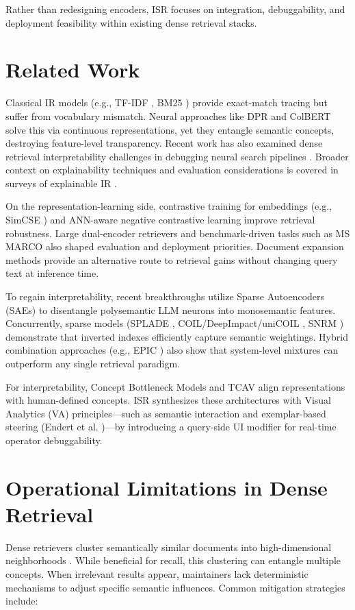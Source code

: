 \documentclass[sigconf,authordraft]{acmart}
\begin{document}
Rather than redesigning encoders, ISR focuses on integration, debuggability, and deployment feasibility within existing dense retrieval stacks.

\section{Related Work}
Classical IR models (e.g., TF-IDF \cite{croft2010}, BM25 \cite{robertson2009}) provide exact-match tracing but suffer from vocabulary mismatch. Neural approaches like DPR \cite{karpukhin2020} and ColBERT \cite{khattab2020} solve this via continuous representations, yet they entangle semantic concepts, destroying feature-level transparency. Recent work has also examined dense retrieval interpretability challenges in debugging neural search pipelines \cite{zhao2023}. Broader context on explainability techniques and evaluation considerations is covered in surveys of explainable IR \cite{anand2022}.

On the representation-learning side, contrastive training for embeddings (e.g., SimCSE \cite{gao2021}) and ANN-aware negative contrastive learning \cite{xiong2021} improve retrieval robustness. Large dual-encoder retrievers \cite{ni2022} and benchmark-driven tasks such as MS MARCO \cite{craswell2020} also shaped evaluation and deployment priorities. Document expansion methods \cite{nogueira2019} provide an alternative route to retrieval gains without changing query text at inference time.

To regain interpretability, recent breakthroughs utilize Sparse Autoencoders (SAEs) \cite{bricken2023, cunningham2024} to disentangle polysemantic LLM neurons into monosemantic features.
Concurrently, sparse models (SPLADE \cite{formal2021}, COIL/DeepImpact/uniCOIL \cite{lin2021_notes}, SNRM \cite{zamani2017}) demonstrate that inverted indexes efficiently capture semantic weightings. Hybrid combination approaches (e.g., EPIC \cite{macavaney2020}) also show that system-level mixtures can outperform any single retrieval paradigm.

For interpretability, Concept Bottleneck Models and TCAV \cite{kim2018} align representations with human-defined concepts. ISR synthesizes these architectures with Visual Analytics (VA) principles—such as semantic interaction and exemplar-based steering (Endert et al. \cite{endert2018})—by introducing a query-side UI modifier for real-time operator debuggability.

\section{Operational Limitations in Dense Retrieval}
Dense retrievers cluster semantically similar documents into high-dimensional neighborhoods \cite{karpukhin2020,izacard2022}. While beneficial for recall, this clustering can entangle multiple concepts. When irrelevant results appear, maintainers lack deterministic mechanisms to adjust specific semantic influences. Common mitigation strategies include:
\end{document}
